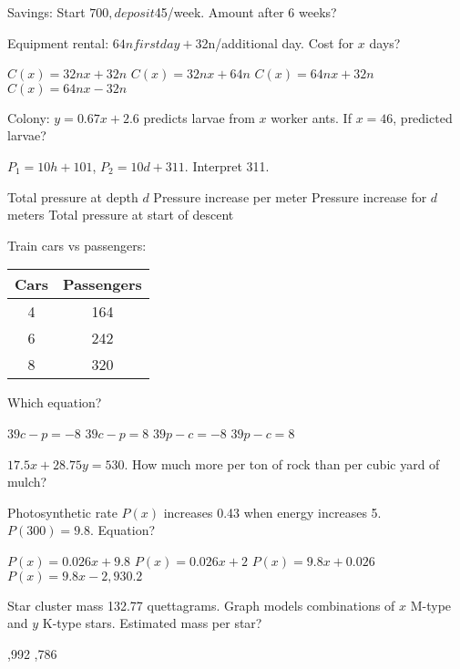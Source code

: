 \documentclass[12pt]{exam}
\begin{document}
\begin{questions}
\question Savings: Start $700, deposit $45/week. Amount after 6 weeks?
\begin{choices}
\end{choices}

\question Equipment rental: $64n first day + $32n/additional day. Cost for $x$ days?
\begin{choices}
\choice $C(x) = 32nx + 32n$
\choice $C(x) = 32nx + 64n$
\choice $C(x) = 64nx + 32n$
\choice $C(x) = 64nx - 32n$
\end{choices}

\question Colony: $y = 0.67x + 2.6$ predicts larvae from $x$ worker ants. If $x = 46$, predicted larvae?
\begin{choices}
\end{choices}

\question $P_1 = 10h + 101$, $P_2 = 10d + 311$. Interpret 311.
\begin{choices}
\choice Total pressure at depth $d$
\choice Pressure increase per meter
\choice Pressure increase for $d$ meters
\choice Total pressure at start of descent
\end{choices}

\question Train cars vs passengers:
\begin{center}
\begin{tabular}{|c|c|}
\hline
Cars & Passengers \\
\hline
4 & 164 \\
6 & 242 \\
8 & 320 \\
\hline
\end{tabular}
\end{center}
Which equation?
\begin{choices}
\choice $39c - p = -8$
\choice $39c - p = 8$
\choice $39p - c = -8$
\choice $39p - c = 8$
\end{choices}

\question $17.5x + 28.75y = 530$. How much more per ton of rock than per cubic yard of mulch?

\question Photosynthetic rate $P(x)$ increases 0.43 when energy increases 5. $P(300) = 9.8$. Equation?
\begin{choices}
\choice $P(x) = 0.026x + 9.8$
\choice $P(x) = 0.026x + 2$
\choice $P(x) = 9.8x + 0.026$
\choice $P(x) = 9.8x - 2,930.2$
\end{choices}

\question Star cluster mass 132.77 quettagrams. Graph models combinations of $x$ M-type and $y$ K-type stars. Estimated mass per star?
\begin{choices}
,992
,786
\end{choices}


\end{questions}
\end{document}
